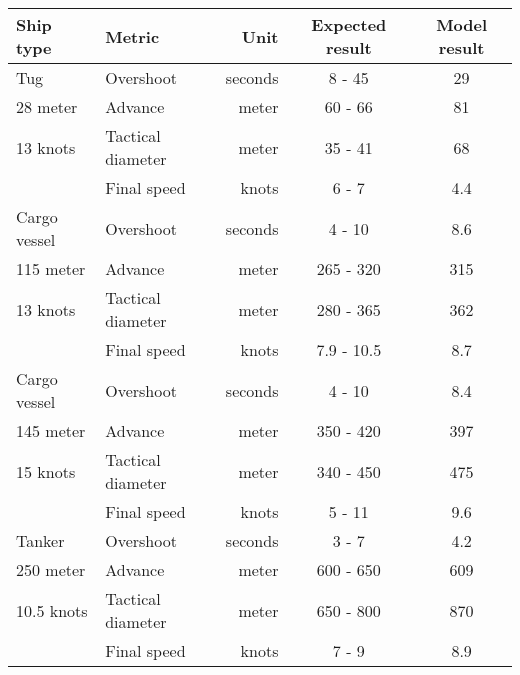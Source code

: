 \begin{table}[hp]
	\centering
	\begin{tabular}{l|l r|c|c}
		\toprule
		Ship type & Metric & Unit & Expected result & Model result \\
		\midrule
		Tug 	& Overshoot & seconds & 8 - 45 & 29 \\
		28 meter & Advance & meter & 60 - 66 & 81 \\
		13 knots & Tactical diameter & meter & 35 - 41 & 68 \\
				& Final speed & knots & 6 - 7 & 4.4 \\
		\midrule
		Cargo vessel 	& Overshoot & seconds & 4 - 10 & 8.6 \\
		115 meter & Advance & meter & 265 - 320 & 315 \\
		13 knots & Tactical diameter & meter & 280 - 365 & 362 \\
		& Final speed & knots & 7.9 - 10.5 & 8.7 \\
		\midrule
		Cargo vessel & Overshoot & seconds & 4 - 10 & 8.4 \\
		145 meter & Advance & meter & 350 - 420 & 397 \\
		15 knots & Tactical diameter & meter & 340 - 450 & 475\\
		& Final speed & knots & 5 - 11 & 9.6 \\
		\midrule
		Tanker 	& Overshoot & seconds & 3 - 7 & 4.2 \\
		250 meter & Advance & meter & 600 - 650 & 609 \\
		10.5 knots & Tactical diameter & meter & 650 - 800 & 870 \\
		& Final speed & knots & 7 - 9 & 8.9 \\
		\bottomrule
	\end{tabular}
	
	\label{tab:validation-model}
\end{table}

\afterpage{\clearpage}

\newpage
